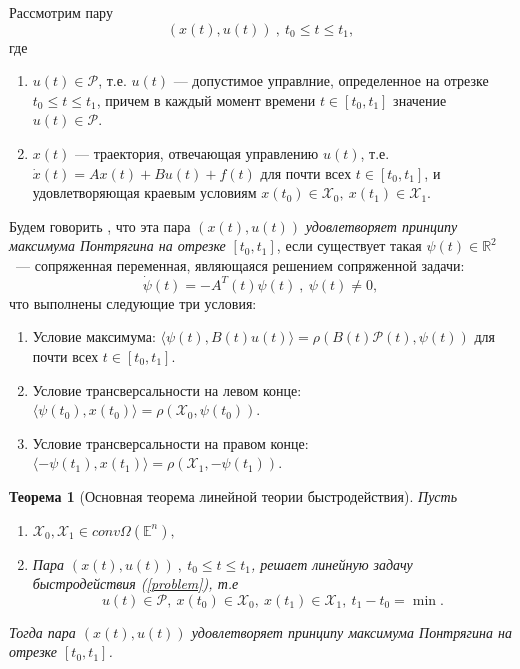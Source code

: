 \documentclass[10pt]{article}
\newtheorem{theorem}{Теорема}
\begin{document}
\noindent Рассмотрим пару
\[ (x(t), u(t)) \ , \ t_0 \leq t \leq t_1, \]
где
\begin{enumerate}
 	\item \(u(t) \in \mathcal{P}\), т.е. \( u(t) \) --- допустимое управлние, определенное на отрезке \( t_0 \leq t \leq t_1 \), причем в каждый момент времени \(t \in [t_0, t_1] \) значение \( u(t) \in \mathcal{P} \).
 	\item \( x(t) \) --- траектория, отвечающая управлению \( u(t) \), т.е. \( \dot{x}(t) = Ax(t) + Bu(t) + f(t) \) для почти всех \( t \in [t_0, t_1] \), и удовлетворяющая краевым условиям \( x(t_0) \in \mathcal{X}_0, \ x(t_1) \in \mathcal{X}_1 \).
\end{enumerate}
Будем говорить , что эта пара \( (x(t), u(t)) \) \emph{удовлетворяет принципу максимума Понтрягина на отрезке} \( [t_0, t_1] \), если существует такая \( \psi(t) \in \mathbb{R}^2\) ~--- сопряженная переменная, являющаяся решением сопряженной задачи:
\[ \dot{\psi}(t) = -A^T(t) \psi(t) \ , \ \psi(t) \neq 0,\]
что выполнены следующие три условия:
\begin{enumerate}
	\item Условие максимума: \( \langle \psi(t), B(t)u(t) \rangle = \rho(B(t) \mathcal{P}(t) , \psi(t))\) для почти всех \( t \in [t_0, t_1]. \)
	\item Условие трансверсальности на левом конце: \( \langle \psi(t_0), x(t_0) \rangle = \rho(\mathcal{X}_0 , \psi(t_0)).\)
	\item Условие трансверсальности на правом конце: \(\langle -\psi(t_1), x(t_1) \rangle = \rho(\mathcal{X}_1 , -\psi(t_1)).\)
\end{enumerate}

\begin{theorem}[Основная теорема линейной теории быстродействия]
	Пусть
	\begin{enumerate}
		\item \( \mathcal{X}_0, \mathcal{X}_1 \in conv \Omega( \mathbb{E}^{n}),\)
		\item Пара \( (x(t), u(t)) \ , \ t_0 \leq t \leq t_1\), решает линейную задачу быстродействия (\ref{problem}), т.е 
		 \[ u(t) \in \mathcal{P}, \ x(t_0) \in \mathcal{X}_0, \ x(t_1) \in \mathcal{X}_1, \ t_1 - t_0 = \min. \]
	\end{enumerate}
	Тогда пара \( (x(t), u(t)) \) удовлетворяет принципу максимума Понтрягина на отрезке \( [t_0, t_1] \).
\end{theorem}
\end{document}
